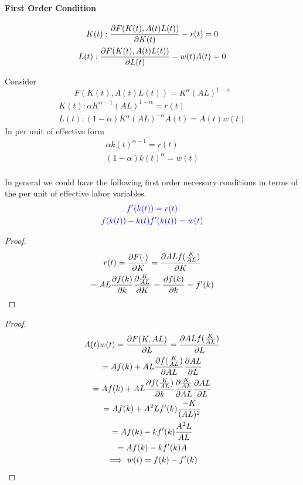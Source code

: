 \documentclass[11pt]{article}
\begin{document}
			\paragraph{First Order Condition}
			\begin{gather*}
				K(t) : \frac{\partial{F(K(t), A(t)L(t))}}{\partial{K(t)}} - r(t) = 0 \\
				L(t) : \frac{\partial{F(K(t), A(t)L(t))}}{\partial{L(t)}} - w(t)A(t) = 0
			\end{gather*}
			
			\begin{example}
				Consider 
				\[
					F(K(t), A(t)L(t)) = K^\alpha (AL)^{1-\alpha}
				\]
				\begin{gather*}
					K(t) : \alpha K^{\alpha - 1} (AL)^{1-\alpha} = r(t)\\
					L(t) : (1-\alpha) K^\alpha (AL)^{-\alpha}A(t) =A(t) w(t)
				\end{gather*}
				In per unit of effective form
				\begin{gather*}
					\alpha k(t) ^ {\alpha - 1} = r(t) \\
					(1-\alpha) k(t) ^ \alpha = w(t) \\
				\end{gather*}
			\end{example}
			In general we could have the following first order necessary conditions in terms of the per unit of effective labor variables.
			\begin{gather*}
			\textcolor{blue}{
				f'(k(t)) = r(t)
			} \\
			\textcolor{blue}{
				f(k(t)) - k(t) f'(k(t)) = w(t)
			}
			\end{gather*}
			
			\begin{proof}
    			\begin{gather*}
    			    r(t) = \frac{\partial{F(\cdot)}}{\partial{K}} 
    			    = \frac{\partial{AL f(\frac{K}{AL})}}{\partial{K}} \\
    			    = AL \frac{\partial{f(k)}}{\partial{k}} \frac{\partial{\frac{K}{AL}}}{\partial{K}} 
    			    = \frac{\partial{f(k)}}{\partial{k}} 
    			    = f'(k)
    			\end{gather*}
			\end{proof}
			
			\begin{proof}
                \begin{gather*}
                    A(t)w(t) = \frac{\partial{F(K, AL)}}{\partial{L}} = \frac{\partial{AL f(\frac{K}{AL})}}{\partial{L}} \\
                    = Af(k) + AL \frac{\partial{f(\frac{K}{AL})}}{\partial{AL}} \frac{\partial{AL}}{\partial{L}} \\
                    = Af(k) + AL \frac{\partial{f(\frac{K}{AL})}}{\partial{k}} \frac{\partial{\frac{K}{AL}}}{\partial{AL}} \frac{\partial{AL}}{\partial{L}} \\
                    = Af(k) + A^2 L f'(k) \frac{-K}{(AL)^2} \\
                    = Af(k) - k f'(k) \frac{A^2 L}{AL} \\
                    = Af(k) - k f'(k) A \\
                    \implies w(t) = f(k) - f'(k)
                \end{gather*}
			\end{proof}
			
\end{document}
